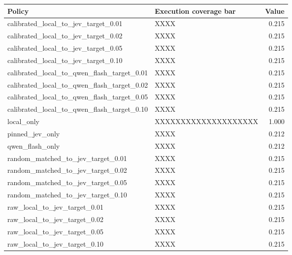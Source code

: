 \begin{tabular}{llr}
\toprule
Policy & Execution coverage bar & Value \\
\midrule
calibrated\_local\_to\_jev\_target\_0.01 & XXXX & 0.215 \\
calibrated\_local\_to\_jev\_target\_0.02 & XXXX & 0.215 \\
calibrated\_local\_to\_jev\_target\_0.05 & XXXX & 0.215 \\
calibrated\_local\_to\_jev\_target\_0.10 & XXXX & 0.215 \\
calibrated\_local\_to\_qwen\_flash\_target\_0.01 & XXXX & 0.215 \\
calibrated\_local\_to\_qwen\_flash\_target\_0.02 & XXXX & 0.215 \\
calibrated\_local\_to\_qwen\_flash\_target\_0.05 & XXXX & 0.215 \\
calibrated\_local\_to\_qwen\_flash\_target\_0.10 & XXXX & 0.215 \\
local\_only & XXXXXXXXXXXXXXXXXXXX & 1.000 \\
pinned\_jev\_only & XXXX & 0.212 \\
qwen\_flash\_only & XXXX & 0.212 \\
random\_matched\_to\_jev\_target\_0.01 & XXXX & 0.215 \\
random\_matched\_to\_jev\_target\_0.02 & XXXX & 0.215 \\
random\_matched\_to\_jev\_target\_0.05 & XXXX & 0.215 \\
random\_matched\_to\_jev\_target\_0.10 & XXXX & 0.215 \\
raw\_local\_to\_jev\_target\_0.01 & XXXX & 0.215 \\
raw\_local\_to\_jev\_target\_0.02 & XXXX & 0.215 \\
raw\_local\_to\_jev\_target\_0.05 & XXXX & 0.215 \\
raw\_local\_to\_jev\_target\_0.10 & XXXX & 0.215 \\
\bottomrule
\end{tabular}
